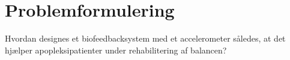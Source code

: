 \section{Problemformulering}
Hvordan designes et biofeedbacksystem med et accelerometer således, at det hjælper apopleksipatienter under rehabilitering af balancen?


